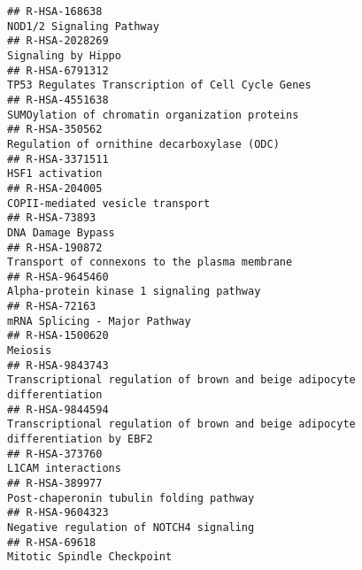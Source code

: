 \documentclass[
]{article}
\begin{document}
\begin{verbatim}
## R-HSA-168638                                                                                                              NOD1/2 Signaling Pathway
## R-HSA-2028269                                                                                                                   Signaling by Hippo
## R-HSA-6791312                                                                                     TP53 Regulates Transcription of Cell Cycle Genes
## R-HSA-4551638                                                                                       SUMOylation of chromatin organization proteins
## R-HSA-350562                                                                                           Regulation of ornithine decarboxylase (ODC)
## R-HSA-3371511                                                                                                                      HSF1 activation
## R-HSA-204005                                                                                                      COPII-mediated vesicle transport
## R-HSA-73893                                                                                                                      DNA Damage Bypass
## R-HSA-190872                                                                                         Transport of connexons to the plasma membrane
## R-HSA-9645460                                                                                             Alpha-protein kinase 1 signaling pathway
## R-HSA-72163                                                                                                          mRNA Splicing - Major Pathway
## R-HSA-1500620                                                                                                                              Meiosis
## R-HSA-9843743                                                              Transcriptional regulation of brown and beige adipocyte differentiation
## R-HSA-9844594                                                      Transcriptional regulation of brown and beige adipocyte differentiation by EBF2
## R-HSA-373760                                                                                                                    L1CAM interactions
## R-HSA-389977                                                                                               Post-chaperonin tubulin folding pathway
## R-HSA-9604323                                                                                              Negative regulation of NOTCH4 signaling
## R-HSA-69618                                                                                                             Mitotic Spindle Checkpoint

\end{verbatim}
\end{document}
